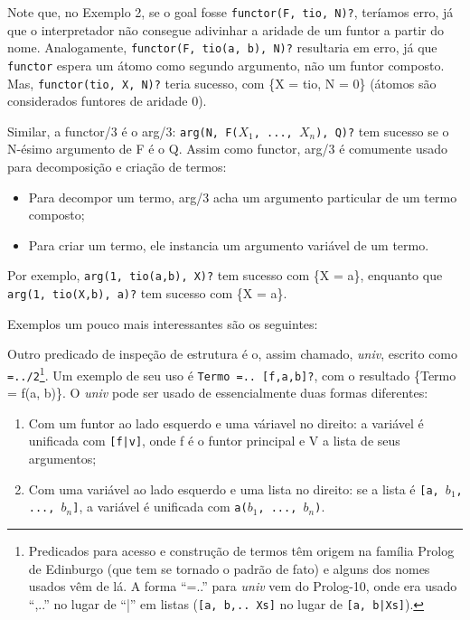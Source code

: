 \documentclass{article}
\theoremstyle{remark}
\theoremstyle{theorem}
\begin{document}
Note que, no Exemplo 2, se o goal fosse {\tt functor(F, tio, N)?}, teríamos erro, já que o interpretador não consegue adivinhar a aridade de um funtor a partir do nome. Analogamente, %
{\tt functor(F, tio(a, b), N)?} resultaria em erro, já que {\tt functor} espera um átomo como segundo argumento, não um funtor composto. Mas, {\tt functor(tio, X, N)?} teria sucesso, com \{X = tio, N = 0\} (átomos são considerados funtores de aridade 0).

Similar, a functor/3 é o arg/3: {\tt arg(N, F($X_1$, ..., $X_n$), Q)?} tem sucesso se o N-ésimo argumento de F é o Q. Assim como functor, arg/3 é comumente usado para decomposição e criação de termos:
\begin{itemize}
  \item Para decompor um termo, arg/3 acha um argumento particular de um termo composto;
  \item Para criar um termo, ele instancia um argumento variável de um termo.
\end{itemize}

Por exemplo, {\tt arg(1, tio(a,b), X)?} tem sucesso com \{X = a\}, enquanto que {\tt arg(1, tio(X,b), a)?} tem sucesso com \{X = a\}.

Exemplos um pouco mais interessantes são os seguintes:





Outro predicado de inspeção de estrutura é o, assim chamado, \textit{univ}, escrito como {\tt =../2}\footnote{Predicados para acesso e construção de termos têm origem na família Prolog de Edinburgo (que tem se tornado o padrão de fato) e alguns dos nomes usados vêm de lá. A forma “=..” para \textit{univ} vem do Prolog-10, onde era usado “,..” no lugar de “|” em listas ({\tt[a, b,.. Xs]} no lugar de {\tt [a, b|Xs]}).}. Um exemplo de seu uso é {\tt Termo =.. [f,a,b]?}, com o resultado \{Termo = f(a, b)\}.
O \textit{univ} pode ser usado de essencialmente duas formas diferentes:
\begin{enumerate}
  \item Com um funtor ao lado esquerdo e uma váriavel no direito: a variável é unificada com {\tt [f|v]}, onde f é o funtor principal e V a lista de seus argumentos;
  \item Com uma variável ao lado esquerdo e uma lista no direito: se a lista é {\tt [a, $b_1$, ..., $b_n$]}, a variável é unificada com {\tt a($b_1$, ..., $b_n$)}.
\end{enumerate}
\end{document}

